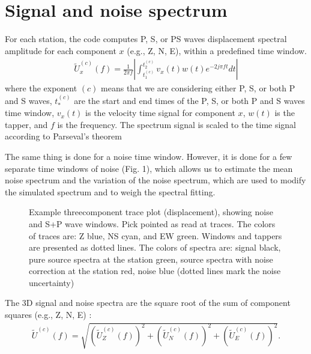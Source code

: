 \documentclass[letterpaper,10pt,english]{sphinxmanual}
\let\sphinxpxdimen\pdfpxdimen\else\newdimen\sphinxpxdimen
\begin{document}
\section{Signal and noise spectrum}
\label{\detokenize{description:signal-and-noise-spectrum}}
\sphinxAtStartPar
For each station, the code computes P, S, or PS waves displacement spectral amplitude
for each component \(x\) (e.g., Z, N, E), within a predefined time window.
\begin{equation*}
\begin{split}\widetilde{U}^{(c)}_x \left(f\right) =\frac{1}{2\pi f}
\left| \int_{t^{(c)}_1}^{t^{(c)}_2} v_x(t)w(t) e^{-2 j \pi f t} dt \right|\end{split}
\end{equation*}
\sphinxAtStartPar
where the exponent \((c)\) means that we are considering either P,
S, or both P and S waves, \(t^{(c)}_*\) are the start and end times of
the P, S, or both P and S waves time window, \(v_x(t)\) is the velocity time signal
for component \(x\), \(w(t)\) is the tapper, and \(f\) is the frequency.
The spectrum signal is scaled to the time signal according to Parseval’s theorem

\sphinxAtStartPar
The same thing is done for a noise time window. However, it is done for a few separate time windows of noise
(Fig. 1), which allows us to estimate the mean noise spectrum and the variation of the noise spectrum,
which are used to modify the simulated spectrum and to weigh the spectral fitting.

\begin{figure}[htbp]
\centering
\capstart

\noindent\sphinxincludegraphics[width=600\sphinxpxdimen]{{example_with_noise}.png}
\caption{Example three\sphinxhyphen{}component trace plot (displacement), showing noise and S+P wave
windows. Pick pointed as read at traces. The colors of traces are: Z \sphinxhyphen{} blue, NS \sphinxhyphen{} cyan, and EW \sphinxhyphen{} green.
Windows and tappers are presented as dotted lines.
The colors of spectra are: signal \sphinxhyphen{} black, pure source spectra at the station \sphinxhyphen{} green,
source spectra with noise correction at the station \sphinxhyphen{} red, noise \sphinxhyphen{} blue
(dotted lines mark the noise uncertainty)}\label{\detokenize{description:id7}}\end{figure}

\sphinxAtStartPar
The 3\sphinxhyphen{}D signal and noise spectra are the square root of the sum of component squares (e.g., Z, N, E) :
\begin{equation*}
\begin{split}\widetilde{U}^{(c)} \left(f\right) = \sqrt{
\left( \widetilde{U}^{(c)}_Z \left(f\right) \right)^2 +
\left( \widetilde{U}^{(c)}_N \left(f\right) \right)^2 +
\left( \widetilde{U}^{(c)}_E \left(f\right) \right)^2
}.\end{split}
\end{equation*}
\end{document}

